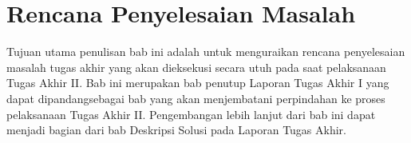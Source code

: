 \chapter{Rencana Penyelesaian Masalah}

Tujuan utama penulisan bab ini adalah untuk menguraikan rencana penyelesaian
masalah tugas akhir yang akan dieksekusi secara utuh pada saat pelaksanaan Tugas
Akhir II. Bab ini merupakan bab penutup Laporan Tugas Akhir I yang dapat
dipandangsebagai bab yang akan menjembatani perpindahan ke proses pelaksanaan
Tugas Akhir II. Pengembangan lebih lanjut dari bab ini dapat menjadi bagian dari
bab Deskripsi Solusi pada Laporan Tugas Akhir.

\blindtext